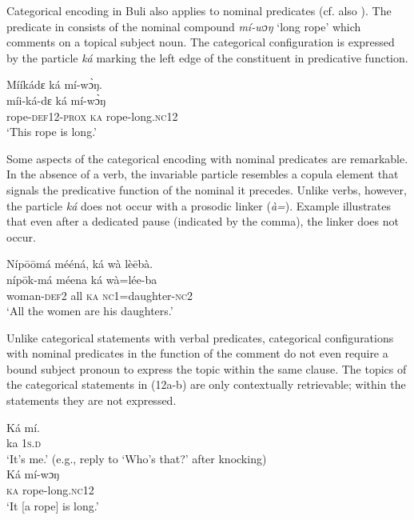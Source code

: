 \documentclass[output=paper]{langsci/langscibook}
\begin{document}
Categorical encoding in Buli also applies to nominal predicates (cf. also \citealt{Schwarz2009}). The predicate in  consists of the nominal compound \textit{mí-wɔŋ} ‘long rope’ which comments on a topical subject noun. The categorical configuration is expressed by the particle \textit{ká} marking the left edge of the constituent in predicative function. 

\ea\label{ex:schwarz:10}
\glll  Mííkádɛ    ká  mí-w\`{ɔ}ŋ.\\
  míi-ká-dɛ    ká  mí-w\`{ɔ}ŋ\\
       rope-\textsc{def}12-\textsc{prox}  \textsc{ka}  rope-long.\textsc{nc}12\\
\glt ‘This rope is long.’
\z

Some aspects of the categorical encoding with nominal predicates are remarkable. In the absence of a verb, the invariable particle resembles a copula element that signals the predicative function of the nominal it precedes. Unlike verbs, however, the particle \textit{ká} does not occur with a prosodic linker (\textit{à=}). Example  illustrates that even after a dedicated pause (indicated by the comma), the linker does not occur.

\ea\label{ex:schwarz:11}
\glll   \textup{Níp}\={o}\={o}má  mééná,    ká  {wà  lè\={e}bà.}\\
    níp\={o}k-má  méena    ká  wà=lée-ba\\
   woman-\textsc{def}2  all    \textsc{ka}  \textsc{nc}1=daughter-\textsc{nc}2\\
\glt ‘All the women are his daughters.’
\z

Unlike categorical statements with verbal predicates, categorical configurations with nominal predicates in the function of the comment do not even require a bound subject pronoun to express the topic within the same clause. The topics of the categorical statements in (12a-b) are only contextually retrievable; within the statements they are not expressed.     


\begin{exe}
	\ex\label{ex:schwarz:12a}\begin{xlist}
		\ex  \gll Ká  mí. \\
			ka  1\textsc{s.d}\\
\glt   ‘It’s me.’ (e.g., reply to ‘Who’s that?’ after knocking) 
{ } \\
		\ex\gll  Ká  mí-wɔŋ\\
			\textsc{ka}  rope-long.\textsc{nc}12\\
    \glt ‘It [a rope] is long.’
	\end{xlist}
\end{exe}
\end{document}
